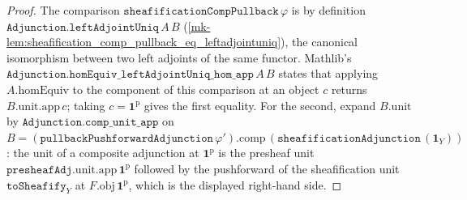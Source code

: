 \begin{proof}
  \leanok
  The comparison \(\mathtt{sheafificationCompPullback}\,\varphi\) is by definition
  \(\mathtt{Adjunction.leftAdjointUniq}\,A\,B\)
  (\ref{mk-lem:sheafification_comp_pullback_eq_leftadjointuniq}), the canonical isomorphism between two left
  adjoints of the same functor. Mathlib's
  \(\mathtt{Adjunction.homEquiv\_leftAdjointUniq\_hom\_app}\,A\,B\) states that applying
  \(A.\mathrm{homEquiv}\) to the component of this comparison at an object \(c\) returns
  \(B.\mathrm{unit}.\mathrm{app}\,c\); taking \(c = \mathbf{1}^{\mathrm{p}}\) gives the first
  equality. For the second, expand \(B.\mathrm{unit}\) by
  \(\mathtt{Adjunction.comp\_unit\_app}\) on \(B = (\mathtt{pullbackPushforwardAdjunction}\,
  \varphi').\mathrm{comp}\,(\mathtt{sheafificationAdjunction}\,(\mathbf{1}_Y))\): the unit of a
  composite adjunction at \(\mathbf{1}^{\mathrm{p}}\) is the presheaf unit
  \(\mathtt{presheafAdj}.\mathrm{unit}.\mathrm{app}\,\mathbf{1}^{\mathrm{p}}\) followed by the
  pushforward of the sheafification unit \(\mathtt{toSheafify}_Y\) at
  \(F.\mathrm{obj}\,\mathbf{1}^{\mathrm{p}}\), which is the displayed right-hand side.
\end{proof}

